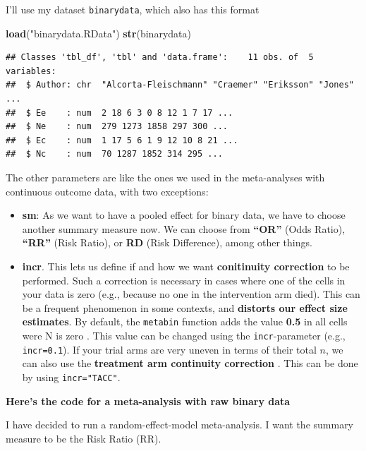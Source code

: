 \documentclass[]{book}
\newenvironment{Shaded}{\begin{snugshade}}{\end{snugshade}}
\newcommand{\KeywordTok}[1]{\textcolor[rgb]{0.13,0.29,0.53}{\textbf{#1}}}
\newcommand{\NormalTok}[1]{#1}
\newcommand{\StringTok}[1]{\textcolor[rgb]{0.31,0.60,0.02}{#1}}
\providecommand{\tightlist}{%
  \setlength{\itemsep}{0pt}\setlength{\parskip}{0pt}}
\begin{document}
I'll use my dataset \texttt{binarydata}, which also has this format

\begin{Shaded}
\begin{Highlighting}[]
\KeywordTok{load}\NormalTok{(}\StringTok{"binarydata.RData"}\NormalTok{)}
\KeywordTok{str}\NormalTok{(binarydata)}
\end{Highlighting}
\end{Shaded}

\begin{verbatim}
## Classes 'tbl_df', 'tbl' and 'data.frame':    11 obs. of  5 variables:
##  $ Author: chr  "Alcorta-Fleischmann" "Craemer" "Eriksson" "Jones" ...
##  $ Ee    : num  2 18 6 3 0 8 12 1 7 17 ...
##  $ Ne    : num  279 1273 1858 297 300 ...
##  $ Ec    : num  1 17 5 6 1 9 12 10 8 21 ...
##  $ Nc    : num  70 1287 1852 314 295 ...
\end{verbatim}

The other parameters are like the ones we used in the meta-analyses with continuous outcome data, with two exceptions:

\begin{itemize}
\tightlist
\item
  \textbf{sm}: As we want to have a pooled effect for binary data, we have to choose another summary measure now. We can choose from \textbf{``OR''} (Odds Ratio), \textbf{``RR''} (Risk Ratio), or \textbf{RD} (Risk Difference), among other things.
\item
  \textbf{incr}. This lets us define if and how we want \textbf{conitinuity correction} to be performed. Such a correction is necessary in cases where one of the cells in your data is zero (e.g., because no one in the intervention arm died). This can be a frequent phenomenon in some contexts, and \textbf{distorts our effect size estimates}. By default, the \texttt{metabin} function adds the value \textbf{0.5} in all cells were N is zero \citep{gart1967bias}. This value can be changed using the \texttt{incr}-parameter (e.g., \texttt{incr=0.1}). If your trial arms are very uneven in terms of their total \(n\), we can also use the \textbf{treatment arm continuity correction} \citep{j2004add}. This can be done by using \texttt{incr="TACC"}.
\end{itemize}

\textbf{Here's the code for a meta-analysis with raw binary data}

I have decided to run a random-effect-model meta-analysis. I want the summary measure to be the Risk Ratio (RR).
\end{document}
